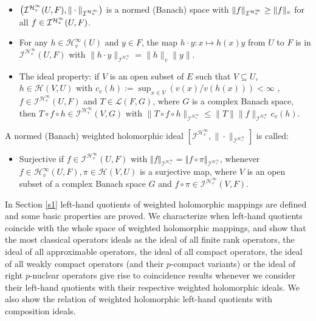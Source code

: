 \documentclass[12pt]{amsart}
\theoremstyle{plain}
\numberwithin{equation}{section}
\begin{document}
\begin{itemize}
\item[(P1)] $\left(\mathcal{I}^{\mathcal{H}_v^{\infty}}(U,F),\|\cdot\|_{%
\mathcal{I}^{\mathcal{H}_v^{\infty}}}\right)$ is a normed (Banach) space with $\|f\|_{%
\mathcal{I}^{\mathcal{H}_v^{\infty}}}\geq \|f\|_v$ for all $f\in\mathcal{I}^{%
\mathcal{H}_v^{\infty}}(U,F)$.

\item[(P2)] For any $h\in\mathcal{H}_v^{\infty}(U)$ and $y\in F$, the map $%
h\cdot y\colon x\mapsto h(x)y$ from $U$ to $F$ is in $\mathcal{I}^{\mathcal{H%
}_v^{\infty}}(U,F)$ with $\|h\cdot y\|_{\mathcal{I}^{\mathcal{H}%
_v^{\infty}}}=\|h\|_v\|y\|$.

\item[(P3)] The ideal property: if $V$ is an open subset of $E$ such that $%
V\subseteq U$, $h\in\mathcal{H}(V,U)$ with $c_v(h):=\sup_{x\in
V}(v(x)/v(h(x)))<\infty$ , $f\in \mathcal{I}^{\mathcal{H}_v^{\infty}}(U,F)$
and $T\in\mathcal{L}(F,G)$, where $G$ is a complex Banach space, then $%
T\circ f\circ h\in\mathcal{I}^{\mathcal{H}_v^{\infty}}(V,G)$ with $\|T\circ
f\circ h\|_{\mathcal{I}^{\mathcal{H}_v^{\infty}}}\leq \|T\|\|f\|_{\mathcal{I}%
^{\mathcal{H}_v^{\infty}}}c_v(h)$.
\end{itemize}

A normed (Banach) weighted holomorphic ideal $[\mathcal{I}^{\mathcal{H}%
_v^{\infty}},\|\cdot\|_{\mathcal{I}^{\mathcal{H}_v^{\infty}}}]$ is called:

\begin{itemize}
\item[(S)] Surjective if $f\in \mathcal{I}^{\mathcal{H}_{v}^{\infty }}(U,F)$
with $\left\Vert f\right\Vert _{\mathcal{I}^{\mathcal{H}_{v}^{\infty
}}}=\left\Vert f\circ \pi \right\Vert _{\mathcal{I}^{\mathcal{H}_{v}^{\infty
}}}$, whenever $f\in \mathcal{H}_{v}^{\infty }(U,F),\pi \in \mathcal{H}(V,U)$ is a surjective map, where $V$ is an open subset of a complex Banach space 
$G$ and $f\circ \pi \in \mathcal{I}^{\mathcal{H}_{v}^{\infty }}(V,F).$
\end{itemize}

In Section \ref{s1} left-hand quotients of weighted holomorphic mappings are defined and some basic properties are proved. We characterize when  left-hand quotients coincide with the whole space of weighted holomorphic mappings, and show that the most classical operators ideals as the ideal of all finite rank operators, the ideal of all approximable operators, the ideal of all compact operators, the ideal of all weakly compact operators (and their $p$-compact variants) or the ideal of right $p$-nuclear operators give rise to coincidence results whenever we consider their left-hand quotients with their respective weighted holomorphic ideals. We also show the relation of weighted holomorphic left-hand quotients with composition ideals.
\end{document}
